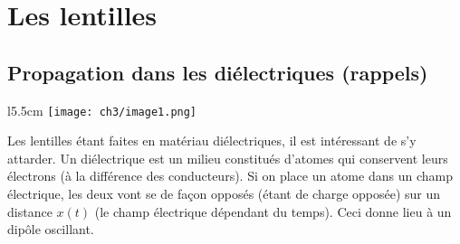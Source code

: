 \chapter{Les lentilles}

\setcounter{section}{-1}
\section{Propagation dans les diélectriques (rappels)}
\begin{wrapfigure}[10]{l}{5.5cm}
	\vspace{-5mm}
	\texttt{[image: ch3/image1.png]}
	\end{wrapfigure}	
Les lentilles étant faites en matériau diélectriques, il est intéressant de s'y attarder. Un diélectrique 
est un milieu constitués d'atomes qui conservent leurs électrons (à la différence des conducteurs). Si on 
place un atome dans un champ électrique, les deux vont se de façon opposés (étant de charge opposée) sur 
un distance $x(t)$ (le champ électrique dépendant du temps). Ceci donne lieu à un dipôle oscillant.\\

